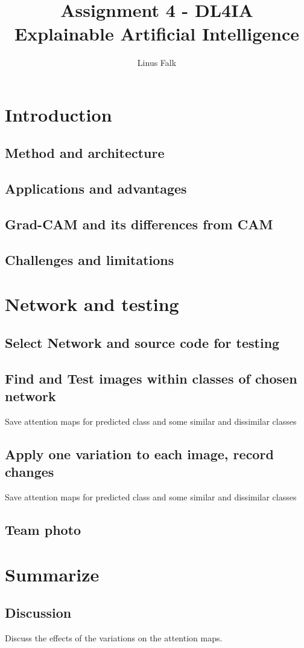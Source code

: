 \documentclass[a4paper]{article}
\title{Assignment 4 - DL4IA \\ Explainable Artificial Intelligence}
\author{Linus Falk}
\begin{document}
\maketitle

\section{Introduction}


\subsection{Method and architecture}

\subsection{Applications and advantages}

\subsection{Grad-CAM and its differences from CAM}

\subsection{Challenges and limitations}


\vspace{1cm}


\section{Network and testing}


\subsection{Select Network and source code for testing}


\subsection{Find and Test images within classes of chosen network}
Save attention maps for predicted class and some similar and dissimilar classes



\subsection{Apply one variation to each image, record changes}
Save attention maps for predicted class and some similar and dissimilar classes

\subsection{Team photo}

\section{Summarize}

\subsection*{Discussion}
Discuss the effects of the variations on the attention maps.









\end{document}
